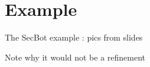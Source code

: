 
\section{Example}
\label{sec:example}
The SecBot example : pics from slides

Note why it would not be a refinement 



